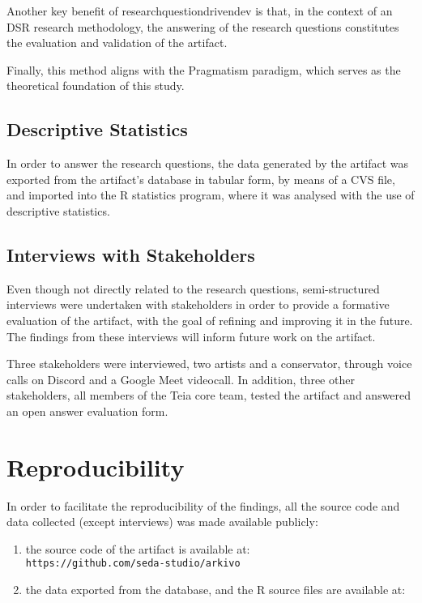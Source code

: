 Another key benefit of \gls{researchquestiondrivendev} is that, in the context of an DSR research methodology, the answering of the research questions constitutes the evaluation and validation of the artifact.

Finally, this method aligns with the Pragmatism paradigm, which serves as the theoretical foundation of this study.

\subsection{Descriptive Statistics}

In order to answer the research questions, the data generated by the artifact was exported from the artifact's database in tabular form, by means of a CVS file, and imported into the R statistics program, where it was analysed with the use of descriptive statistics.

\subsection{Interviews with Stakeholders}

Even though not directly related to the research questions, semi-structured interviews were undertaken with stakeholders in order to provide a formative evaluation of the artifact, with the goal of refining and improving it in the future. The findings from these interviews will inform future work on the artifact.

Three stakeholders were interviewed, two artists and a conservator, through voice calls on Discord and a Google Meet videocall.
In addition, three other stakeholders, all members of the Teia core team, tested the artifact and answered an open answer evaluation form.

\section{Reproducibility}

In order to facilitate the reproducibility of the findings, all the source code and data collected (except interviews) was made available publicly:

\begin{enumerate}
    \item the source code of the artifact is available at:\\ \texttt{https://github.com/seda-studio/arkivo}
    \item the data exported from the database, and the R source files are available at: \todo
\end{enumerate}


